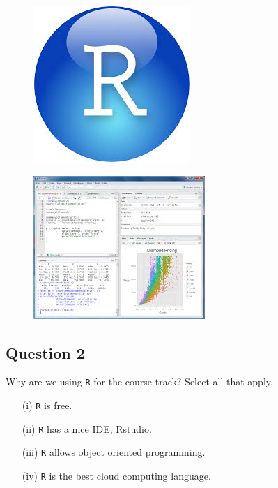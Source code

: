 \documentclass[12pt]{article}
\begin{document}
\begin{figure}[h!]
\centering
\includegraphics[width=0.6\linewidth]{rstudio}
\end{figure}
\newpage
\begin{figure}[h!]
\centering
\includegraphics[width=0.6\linewidth]{rstudio2}
\end{figure}



\newpage
\subsection*{Question 2}

 
Why are we using \texttt{R} for the course track? Select all that apply. 


\begin{itemize}

\item[(i)] \texttt{R} is free. 

\item[(ii)] \texttt{R} has a nice IDE, Rstudio. 

\item[(iii)] \texttt{R} allows object oriented programming. 

\item[(iv)] \texttt{R} is the best cloud computing language. 

\end{itemize}
\end{document}
